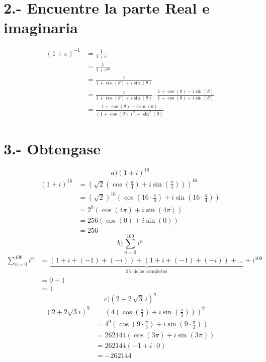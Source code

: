 \documentclass{article}
\begin{document}
\section*{2.- Encuentre la parte Real e imaginaria }
\newline
\begin{align*}
(1 + e)^{-1} &= \frac{1}{1 + e} \\
&= \frac{1}{1 + e^{i\theta}} \\
&= \frac{1}{1 + \cos(\theta) + i \sin(\theta)} \\
&= \frac{1}{1 + \cos(\theta) + i \sin(\theta)} \cdot \frac{1 + \cos(\theta) - i \sin(\theta)}{1 +\cos(\theta) - i \sin(\theta)} \\
&= \frac{1 + \cos(\theta) - i \sin(\theta)}{(1 + \cos(\theta))^2 - \sin^2(\theta)}
\end{align*}
\newpage
\section*{3.- Obtengase }
\newline
\[
a) \left(1+i\right)^{16}
\]
\newline
\begin{align*}
\left(1+i\right)^{16} &= \left(\sqrt{2} \left(\cos\left(\frac{\pi}{4}\right) + i\sin\left(\frac{\pi}{4}\right)\right)\right)^{16} \\
&= \left(\sqrt{2}\right)^{16} \left(\cos\left(16\cdot\frac{\pi}{4}\right) + i\sin\left(16\cdot\frac{\pi}{4}\right)\right) \\
&= 2^8 \left(\cos(4\pi) + i\sin(4\pi)\right) \\
&= 256 \left(\cos(0) + i\sin(0)\right) \\
&= 256
\end{align*}
\newline
\[
b) \sum_{n=0}^{100} i^n
\]
\newline
\begin{align*}
\sum_{n=0}^{100} i^n &= \underbrace{(1 + i + (-1) + (-i)) + (1 + i + (-1) + (-i)) + \dots}_{\text{25 ciclos completos}} + i^{100} \\
&= 0 + 1 \\
&= 1
\end{align*}
\newline
\[
c)\left(2+2\,\sqrt{3}\,i\right)^{9}
\]
\begin{align*}
\left(2+2\sqrt{3}i\right)^{9} &= \left(4\left(\cos\left(\frac{\pi}{3}\right) + i\sin\left(\frac{\pi}{3}\right)\right)\right)^{9} \\
&= 4^9 \left(\cos\left(9\cdot\frac{\pi}{3}\right) + i\sin\left(9\cdot\frac{\pi}{3}\right)\right) \\
&= 262144 \left(\cos(3\pi) + i\sin(3\pi)\right) \\
&= 262144 \left(-1 + i \cdot 0\right) \\
&= -262144
\end{align*}
\newpage
\end{document}
